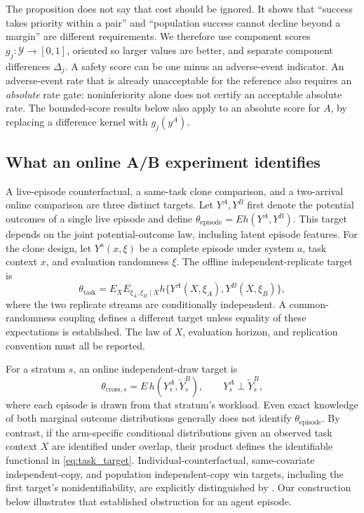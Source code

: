 The proposition does not say that cost should be ignored. It shows that
``success takes priority within a pair'' and ``population success cannot
decline beyond a margin'' are different requirements. We therefore use
component scores $g_j:\mathcal Y\to[0,1]$, oriented so larger values are
better, and separate component differences $\Delta_j$. A safety score can
be one minus an adverse-event indicator. An adverse-event rate that is
already unacceptable for the reference also requires an \emph{absolute}
rate gate: noninferiority alone does not certify an acceptable absolute
rate. The bounded-score results below also apply to an absolute score for
$A$, by replacing a difference kernel with $g_j(y^A)$.

\subsection{What an online A/B experiment identifies}

A live-episode counterfactual, a same-task clone comparison, and a
two-arrival online comparison are three distinct targets. Let
$Y^A,Y^B$ first denote the potential outcomes of a single live episode
and define $\theta_{\mathrm{episode}}=E h(Y^A,Y^B)$. This target depends
on the joint potential-outcome law, including latent episode features.
For the clone design, let $Y^a(x,\xi)$ be a complete
episode under system $a$, task context $x$, and evaluation randomness
$\xi$. The offline independent-replicate target is
\begin{equation}
 \theta_{\mathrm{task}}
 =E_X E_{\xi_A,\xi_B\mid X}
       h\{Y^A(X,\xi_A),Y^B(X,\xi_B)\}, \label{eq:task_target}
\end{equation}
where the two replicate streams are conditionally independent. A
common-randomness coupling defines a different target unless equality of
these expectations is established. The law of $X$, evaluation horizon,
and replication convention must all be reported.

For a stratum $s$, an online independent-draw target is
\begin{equation}
 \theta_{\mathrm{cross},s}
 = E\,h(Y_s^A,\widetilde Y_s^B),\qquad
 Y_s^A\perp\widetilde Y_s^B, \label{eq:cross_target}
\end{equation}
where each episode is drawn from that stratum's workload. Even exact
knowledge of both marginal outcome distributions generally does not
identify $\theta_{\mathrm{episode}}$. By contrast, if the arm-specific
conditional distributions given an observed task context $X$ are
identified under overlap, their product defines the identifiable
functional in \eqref{eq:task_target}. Individual-counterfactual,
same-covariate independent-copy, and population independent-copy win
targets, including the first target's nonidentifiability, are explicitly
distinguished by \citet{even2025rethinking}. Our construction below
illustrates that established obstruction for an agent episode.

